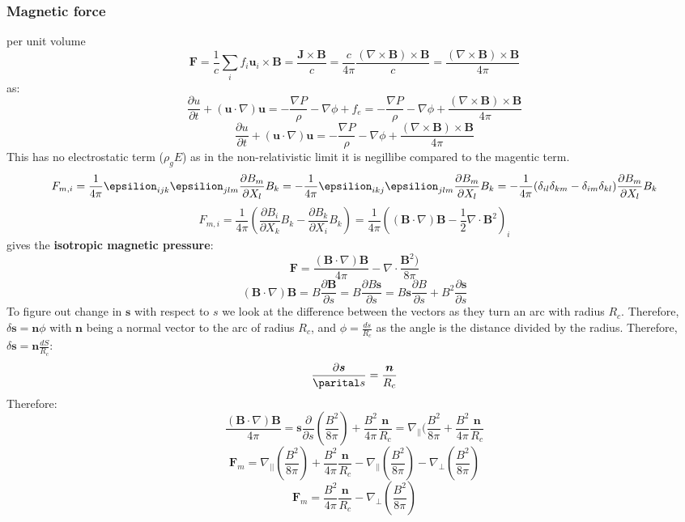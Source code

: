 \documentclass{article}
\begin{document}
{\subsubsection{Magnetic force}
per unit volume
$$
\bm F = \frac{1}{c} \sum_{i} f_i \bm u_i \times \bm B = \frac{\bm J \times \bm B}{c} = \frac{c}{4 \pi} \frac{(\nabla \times \bm B) \times \bm B}{c} = \frac{(\nabla \times \bm B) \times \bm B}{4 \pi}
$$
as:
$$
 \frac{\partial u}{\partial t} + (\bm u \cdot \nabla ) \bm u = - \frac{\nabla P}{\rho} - \nabla \phi + f_e =  - \frac{\nabla P}{\rho} - \nabla \phi +\frac{(\nabla \times \bm B) \times \bm B}{4 \pi}
$$
\begin{equation}
         \frac{\partial u}{\partial t} + (\bm u \cdot \nabla ) \bm u = - \frac{\nabla P}{\rho} - \nabla \phi +\frac{(\nabla \times \bm B) \times \bm B}{4 \pi}

\end{equation}
This has no electrostatic term ($\rho_g E$) as in the non-relativistic limit it is negillibe compared to the magentic term.
$$
F_{m,i} = \frac{1}{4\pi} \epsilion_{ijk} \epsilion_{jlm} \frac{\partial B_m}{\partial X_l}B_k = -\frac{1}{4\pi}  \epsilion_{ikj} \epsilion_{jlm}  \frac{\partial B_m}{\partial X_l}B_k = -\frac{1}{4\pi} (\delta_{il}\delta_{km}- \delta_{im}\delta_{kl})  \frac{\partial B_m}{\partial X_l}B_k
$$
$$
F_{m,i} = \frac{1}{4\pi}( \frac{\partial B_i}{\partial X_k} B_k  - \frac{\partial B_k}{\partial X_i} B_k) = \frac{1}{4\pi}( (\bm B \cdot \nabla) \bm B - \frac{1}{2} \nabla \cdot \bm B^2)_i 
$$
gives the \textbf{isotropic magnetic pressure}:
\begin{equation}
        \bm F = \frac{(\bm B \cdot \nabla) \bm B}{4\pi} -  \nabla \cdot \frac{\bm B^2)}{8\pi}
\end{equation}
$$
(\bm B \cdot \nabla) \bm B =  B \frac{\partial \bm B}{\partial s} = B \frac{\partial B \bm s}{\partial s} =    B  \bm s \frac{\partial B}{\partial s} + B^2  \frac{\partial \bm s}{\partial s}  
$$
To figure out change in $\bm s$ with respect to $s$ we look at the difference between the vectors as they turn an arc with radius $R_c$. Therefore, $\delta \bm s = \bm n \phi$ with $\bm n$ being a normal vector to the arc of radius $R_c$, and $\phi = \frac{ds}{R_c}$ as the angle is the distance divided by the radius. Therefore, $\delta \bm s = \bm n \frac{dS}{R_c}$:
$$
\frac{\partial \bm s}{\parital s} = \frac{\bm n}{R_c}
$$
Therefore:
$$
\frac{(\bm B \cdot \nabla) \bm B}{4\pi} = \bm s \frac{\partial}{\partial s} ( \frac{B^2}{8 \pi}) + \frac{B^2}{4\pi} \frac{\bm n}{R_c}  = \nabla_{||} (\frac{B^2}{8\pi} + \frac{B^2}{4\pi} \frac{\bm n}{R_c}
        $$
        $$
        \bm F_m = \nabla_{||} (\frac{B^2}{8\pi}) + \frac{B^2}{4\pi} \frac{\bm n}{R_c} - \nabla_{||} (\frac{B^2}{8\pi}) - \nabla_{\perp} (\frac{B^2}{8\pi})  
        $$
        \begin{equation}
                  \bm F_m = \frac{B^2}{4\pi} \frac{\bm n}{R_c}- \nabla_{\perp} (\frac{B^2}{8\pi})  


\end{equation}}
\end{document}
